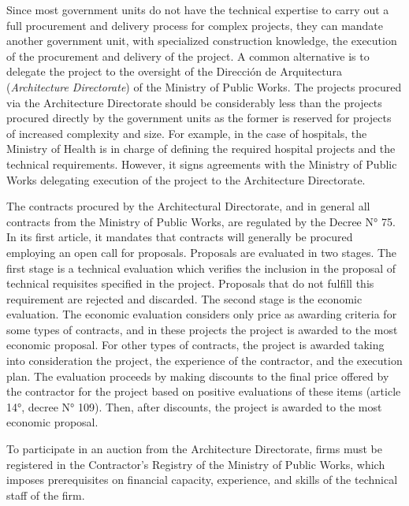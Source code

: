 \begin{enumerate}[wide, labelwidth=!,labelindent=0pt,label=\textbf{\arabic*}.]
Since most government units do not have the technical expertise to carry out a full procurement and delivery process for complex projects, they can mandate another government unit, with specialized construction knowledge, the execution of the procurement and delivery of the project. A common alternative is to delegate the project to the oversight of the Dirección de Arquitectura (\textit{Architecture Directorate}) of the Ministry of Public Works. The projects procured via the Architecture Directorate should be considerably less than the projects procured directly by the government units as the former is reserved for projects of increased complexity and size.  For example, in the case of hospitals, the Ministry of Health is in charge of defining the required hospital projects and the technical requirements. However, it signs agreements with the Ministry of Public Works delegating execution of the project to the Architecture Directorate.

The contracts procured by the Architectural Directorate, and in general all contracts from the Ministry of Public Works, are regulated by the Decree N° 75. In its first article, it mandates that contracts will generally be procured employing an open call for proposals. Proposals are evaluated in two stages. The first stage is a technical evaluation which verifies the inclusion in the proposal of technical requisites specified in the project. Proposals that do not fulfill this requirement are rejected and discarded. The second stage is the economic evaluation. The economic evaluation considers only price as awarding criteria for some types of contracts, and in these projects the project is awarded to the most economic proposal. For other types of contracts, the project is awarded taking into consideration the project, the experience of the contractor, and the execution plan. The evaluation proceeds by making discounts to the final price offered by the contractor for the project based on positive evaluations of these items (article 14°, decree N° 109). Then, after discounts, the project is awarded to the most economic proposal.

To participate in an auction from the Architecture Directorate, firms must be registered in the Contractor's Registry of the Ministry of Public Works, which imposes prerequisites on financial capacity, experience, and skills of the technical staff of the firm.


\end{enumerate}
